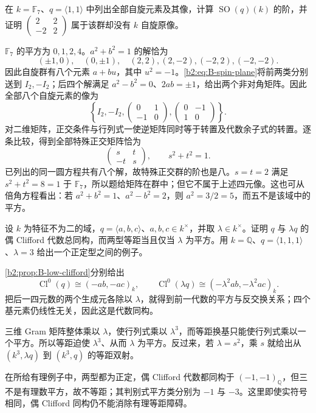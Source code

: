 \begin{exercise}\label{b2:ex:B-finite-spin-image}
	在 \(k=\mathbb F_7\)、\(q=\langle1,1\rangle\) 中列出全部自旋元素及其像，计算 \(\operatorname{SO}(q)(k)\) 的阶，并证明 \(\begin{pmatrix}2&2\\-2&2\end{pmatrix}\) 属于该群却没有 \(k\) 自旋原像。
\end{exercise}
\begin{solution}
	\(\mathbb F_7\) 的平方为 \(0,1,2,4\)。\(a^2+b^2=1\) 的解恰为
	\[
		(\pm1,0),\quad(0,\pm1),\quad(2,2),(2,-2),(-2,2),(-2,-2).
	\]
	因此自旋群有八个元素 \(a+bu\)，其中 \(u^2=-1\)。\eqref{b2:eq:B-spin-plane}将前两类分别送到 \(I_2,-I_2\)；后四个解满足 \(a^2-b^2=0\)、\(2ab=\pm1\)，给出两个非对角矩阵。因此全部八个自旋元素的像为
	\[
		\left\{I_2,-I_2,
		\begin{pmatrix}0&1\\-1&0\end{pmatrix},
		\begin{pmatrix}0&-1\\1&0\end{pmatrix}\right\}.
	\]
	对二维矩阵，正交条件与行列式一使逆矩阵同时等于转置及代数余子式的转置。逐条比较，得到全部特殊正交矩阵恰为
	\[
		\begin{pmatrix}s&t\\-t&s\end{pmatrix},\qquad s^2+t^2=1.
	\]
	已列出的同一圆方程共有八个解，故特殊正交群的阶也是八。\(s=t=2\) 满足 \(s^2+t^2=8=1\) 于 \(\mathbb F_7\)，所以题给矩阵在群中；但它不属于上述四元像。这也可从倍角方程看出：若 \(a^2+b^2=1\)、\(a^2-b^2=2\)，则 \(a^2=3/2=5\)，而五不是该域中的平方。
\end{solution}

\begin{exercise}\label{b2:ex:B-clifford-distinguishes-ternary}
	设 \(k\) 为特征不为二的域，\(q=\langle a,b,c\rangle\)、\(a,b,c\in k^\times\)，并取 \(\lambda\in k^\times\)。证明 \(q\) 与 \(\lambda q\) 的偶 Clifford 代数总同构，而两型等距当且仅当 \(\lambda\) 为平方。用 \(k=\mathbb Q\)、\(q=\langle1,1,1\rangle\)、\(\lambda=3\) 给出一个正定型之间的例子。
\end{exercise}
\begin{solution}
	\cref{b2:prop:B-low-clifford}分别给出
	\[
		\operatorname{Cl}^0(q)\cong(-ab,-ac)_k,\qquad \operatorname{Cl}^0(\lambda q)\cong(-\lambda^2ab,-\lambda^2ac)_k.
	\]
	把后一四元数的两个生成元各除以 \(\lambda\)，就得到前一代数的平方与反交换关系；四个基元素仍线性无关，因此这是代数同构。

	三维 Gram 矩阵整体乘以 \(\lambda\)，使行列式乘以 \(\lambda^3\)，而等距换基只能使行列式乘以一个平方。所以等距迫使 \(\lambda^3\)、从而 \(\lambda\) 为平方。反过来，若 \(\lambda=s^2\)，乘 \(s\) 就给出从 \((k^3,\lambda q)\) 到 \((k^3,q)\) 的等距双射。

	在所给有理例子中，两型都为正定，偶 Clifford 代数都同构于 \((-1,-1)_{\mathbb Q}\)，但三不是有理数平方，故不等距；其判别式平方类分别为 \(-1\) 与 \(-3\)。这里即使实符号相同，偶 Clifford 同构仍不能消除有理等距障碍。
\end{solution}

